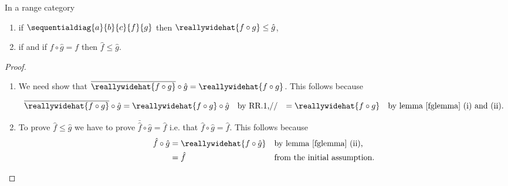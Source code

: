 
\begin{lemma}
In a range category
\begin{enumerate}
\item if $\sequentialdiag{a}{b}{c}{f}{g}$ 
then $\reallywidehat{f \circ g} \leq \hat{g}$,
\item if \fgsinkdiag and if $f\circ \hat{g} = f$ then
  $\hat{f} \leq \hat{g}$.
\end{enumerate}
\end{lemma}
\begin{proof}
\begin{enumerate}
\item
We need show that 
$\overline{\reallywidehat{f \circ g}} \circ \hat{g} = \reallywidehat{f \circ g}$.
This follows because

\begin{align}
\overline{\reallywidehat{f \circ g}} \circ \hat{g} 
          &= \reallywidehat{f \circ g} \circ \hat{g}  &&\mbox{by RR.1,}//
          &= \reallywidehat{f \circ g} 
                &&\mbox{by lemma \ref{fglemma} (i) and (ii).}
\end{align}
\item
To prove $\hat{f} \leq \hat{g}$ we have to prove 
$\bar{\hat{f}} \circ \hat{g} = \hat{f}$ 
i.e. that $\hat{f} \circ \hat{g} = \hat{f}$. 
This follows because   
\begin{align*}
\hat{f} \circ \hat{g} 
     &= \reallywidehat{f \circ \hat{g}}
                  &&\mbox{by lemma \ref{fglemma} (ii),} \\
     &= \hat{f}   && \mbox{from the initial assumption.}
\end{align*}
\end{enumerate} 
\end{proof}

